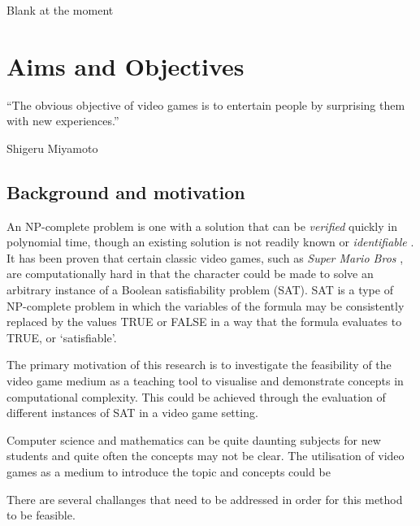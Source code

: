 \documentclass[11pt, a4paper, oneside]{report} %
\begin{document}
Blank at the moment


\tableofcontents






\chapter{Aims and Objectives}


\epigraph{``The obvious objective of video games is to entertain people by
surprising them with new experiences.''}{Shigeru Miyamoto}

\section{Background and motivation}

An NP-complete problem is one with a solution that can be \textit{verified}
quickly in polynomial time, though an existing solution is not readily known or
\textit{identifiable} \cite{cook1984can}. It has been proven that certain
classic video games, such as \textit{Super Mario Bros} \cite{Aloupis2012}, are
computationally hard in that the character could be made to solve an arbitrary
instance of a Boolean satisfiability problem (SAT). SAT is a type of NP-complete
problem in which the variables of the formula may be consistently replaced by
the values TRUE or FALSE in a way that the formula evaluates to TRUE, or
`satisfiable'.

The primary motivation of this research is to investigate the feasibility of the
video game medium as a teaching tool to visualise and demonstrate concepts in
computational complexity. This could be achieved through the evaluation of
different instances of SAT in a video game setting.\@ 

Computer science and mathematics can be quite daunting subjects for new students
and quite often the concepts may not be clear. The utilisation of video games as 
a medium to introduce the topic and concepts could be 

There are several challanges that need to be addressed in order for this method
to be feasible.
\end{document}
